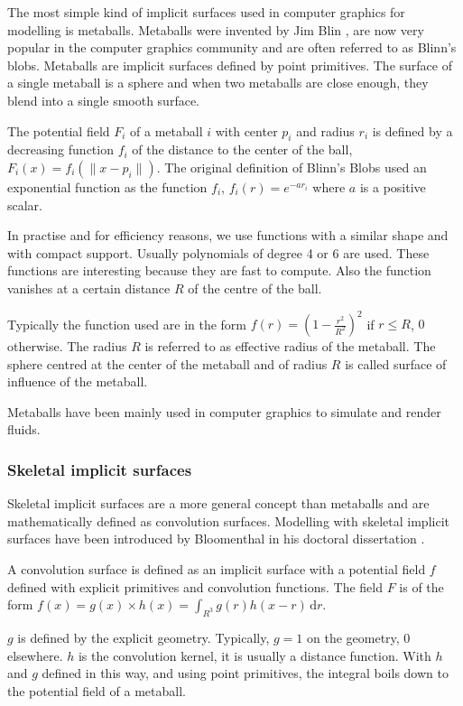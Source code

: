 \documentclass[annual]{acmsiggraph}
\begin{document}
The most simple kind of implicit surfaces used in computer graphics for modelling is metaballs.
Metaballs were invented by Jim Blin \cite{Blinn1982}, are now very popular in the computer graphics community and are often referred to as Blinn's blobs.
Metaballs are implicit surfaces defined by point primitives. The surface of a single metaball is a sphere and when two metaballs are close enough, they blend into a single smooth surface.

The potential field $F_i$ of a metaball $i$ with center $p_i$ and radius $r_i$ is defined by a decreasing function $f_i$ of the distance to the center of the ball, $F_i(x) = f_i(\|x-p_i\|)$.
The original definition of Blinn's Blobs used an exponential function as the function $f_i$, $f_i(r) = e^{-ar_i}$ where $a$ is a positive scalar.

In practise and for efficiency reasons, we use functions with a similar shape and with compact support. Usually polynomials of degree 4 or 6 are used.
These functions are interesting because they are fast to compute. Also the function vanishes at a certain distance $R$ of the centre of the ball.

Typically the function used are in the form $f(r) = \left(1-\frac{r^2}{R^2}\right)^2$ if $r \leq R$, $0$ otherwise.
The radius $R$ is referred to as effective radius of the metaball.
The sphere centred at the center of the metaball and of radius $R$ is called surface of influence of the metaball.

Metaballs have been mainly used in computer graphics to simulate and render fluids.


\subsubsection{Skeletal implicit surfaces}

Skeletal implicit surfaces are a more general concept than metaballs and are mathematically defined as convolution surfaces.
Modelling with skeletal implicit surfaces have been introduced by Bloomenthal in his doctoral dissertation \cite{Bloomenthal:1996:SDN:238973}.

A convolution surface is defined as an implicit surface with a potential field $f$ defined with explicit primitives and convolution functions.
The field $F$ is of the form $f(x)=g(x)\times h(x)= \displaystyle\int_{R^3} \! g(r)h(x-r) \, \mathrm{d}r $.

$g$ is defined by the explicit geometry. Typically, $g = 1$ on the geometry, $0$ elsewhere. $h$ is the convolution kernel, it is usually a distance function.
With $h$ and $g$ defined in this way, and using point primitives, the integral boils down to the potential field of a metaball.
\end{document}
